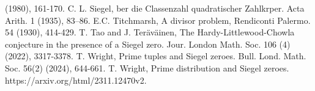 \documentclass{amsart}
\begin{document}
\begin{thebibliography}{[HD]}
(1980), 161-170.
 C. L. Siegel, ber die Classenzahl quadratischer Zahlkrper. Acta Arith. 1 (1935), 83–86.
 E.C. Titchmarsh, A divisor problem, Rendiconti Palermo. 54 (1930), 414-429.
 T. Tao and J. Ter\"{a}v\"{a}inen, The Hardy-Littlewood-Chowla conjecture in the presence of a Siegel zero. Jour. London Math. Soc. 106 (4) (2022), 3317-3378.
 T. Wright, Prime tuples and Siegel zeroes. Bull. Lond. Math. Soc. 56(2) (2024), 644-661.
 T. Wright, Prime distribution and Siegel zeroes. https://arxiv.org/html/2311.12470v2.
\end{thebibliography}
\end{document}
